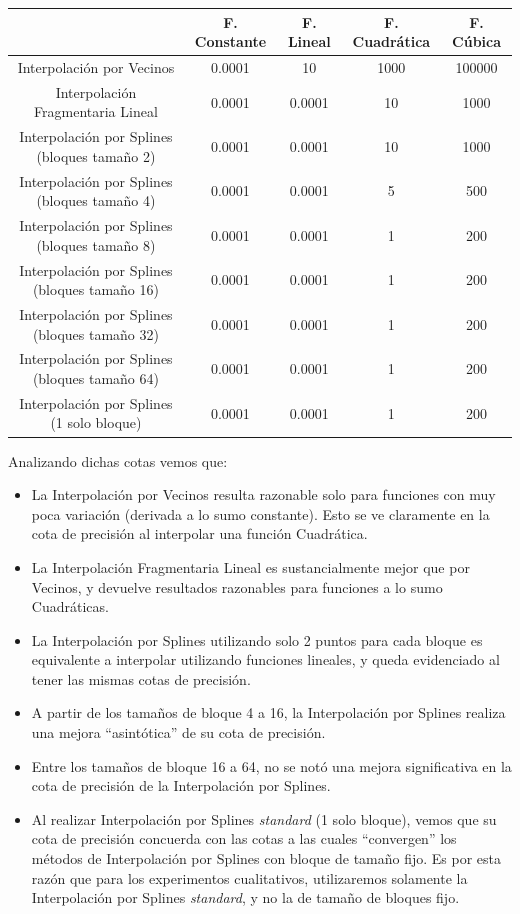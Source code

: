 \begin{table}[H]
    \begin{tabular}{| c | c | c | c | c |}
    \hline
    {} & F. Constante & F. Lineal & F. Cuadrática & F. Cúbica \\ \hline
    Interpolación por Vecinos & 0.0001 & 10 & 1000 & 100000 \\
    Interpolación Fragmentaria Lineal & 0.0001 & 0.0001 & 10 & 1000 \\
    Interpolación por Splines (bloques tamaño 2) & 0.0001 & 0.0001 & 10 & 1000 \\
    Interpolación por Splines (bloques tamaño 4) & 0.0001 & 0.0001 & 5 & 500 \\
    Interpolación por Splines (bloques tamaño 8) & 0.0001 & 0.0001 & 1 & 200 \\
    Interpolación por Splines (bloques tamaño 16) & 0.0001 & 0.0001 & 1 & 200 \\
    Interpolación por Splines (bloques tamaño 32) & 0.0001 & 0.0001 & 1 & 200 \\
    Interpolación por Splines (bloques tamaño 64) & 0.0001 & 0.0001 & 1 & 200 \\
    Interpolación por Splines (1 solo bloque) & 0.0001 & 0.0001 & 1 & 200 \\
    \hline
    \end{tabular}
\end{table}

Analizando dichas cotas vemos que:
\begin{itemize}
    \item La Interpolación por Vecinos resulta razonable solo para funciones con muy
        poca variación (derivada a lo sumo constante). Esto se ve claramente en la
        cota de precisión al interpolar una función Cuadrática.
    \item La Interpolación Fragmentaria Lineal es sustancialmente mejor que por Vecinos,
        y devuelve resultados razonables para funciones a lo sumo Cuadráticas.
    \item La Interpolación por Splines utilizando solo 2 puntos para cada bloque es
        equivalente a interpolar utilizando funciones lineales, y queda evidenciado al
        tener las mismas cotas de precisión.
    \item A partir de los tamaños de bloque 4 a 16, la Interpolación por Splines realiza
        una mejora ``asintótica'' de su cota de precisión.
    \item Entre los tamaños de bloque 16 a 64, no se notó una mejora significativa en la cota
        de precisión de la Interpolación por Splines.
    \item Al realizar Interpolación por Splines \textit{standard} (1 solo bloque),
        vemos que su cota de precisión concuerda con las cotas a las cuales ``convergen''
        los métodos de Interpolación por Splines con bloque de tamaño fijo. Es por esta razón
        que para los experimentos cualitativos, utilizaremos solamente la Interpolación
        por Splines \textit{standard}, y no la de tamaño de bloques fijo.
\end{itemize}

